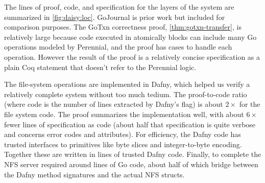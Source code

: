 The lines of proof, code, and specification for the layers of the system are
summarized in \cref{fig:daisy:loc}. GoJournal is prior work but included for
comparison purposes. The GoTxn correctness proof, \cref{thm:gotxn-transfer}, is
relatively large because code executed in atomically blocks can include many Go
operations modeled by Perennial, and the proof has cases to handle
each operation. However the result of the proof is a relatively concise
specification as a plain Coq statement that doesn't refer to the Perennial
logic.




The file-system operations are implemented in Dafny, which helped us verify a
relatively complete system without too much tedium. The
proof-to-code ratio (where code is the number of lines extracted by Dafny's
 flag) is about $2\times$ for the file system code.
The proof summarizes the implementation well, with about $6\times$ fewer lines
of specification as code (about half that specification is quite verbose and concerns
error codes and attributes). For efficiency, the Dafny code has trusted interfaces to
primitives like byte slices and integer-to-byte encoding. Together these are
written in  lines of trusted Dafny code.
Finally, to complete the NFS server required around  lines of Go
code, about half of which bridge between the Dafny method signatures and the
actual NFS structs.


\begin{comment}
begin
    rm -rf src-compiled
    for file in src/*/**.dfy
        set -l path (string sub --start 4 $file)
        set -l dir (dirname $path)
        mkdir -p src-compiled/$dir
        dafny /printMode:NoGhost /dafnyVerify:0 /rprint:src-compiled/$path $file &
    end
    wait
    cloc --read-lang-def ~/dafny-lang.txt src-compiled
    cloc --read-lang-def ~/dafny-lang.txt src
end
\end{comment}

